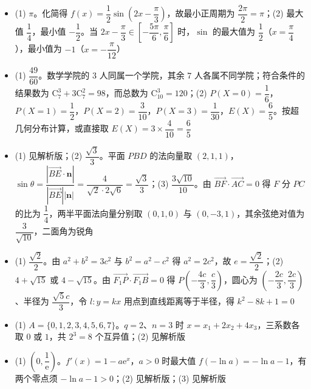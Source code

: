 \begin{itemize}[leftmargin=2.6em]
  \item[\textbf{15.}] (1) $\pi$。化简得 $f(x)=\dfrac12\sin\left(2x-\dfrac\pi3\right)$，故最小正周期为 $\dfrac{2\pi}{2}=\pi$；(2) 最大值 $\dfrac14$，最小值 $-\dfrac12$。当 $2x-\dfrac\pi3\in\left[-\dfrac{5\pi}{6},\dfrac\pi6\right]$ 时，$\sin$ 的最大值为 $\dfrac12$（$x=\dfrac\pi4$），最小值为 $-1$（$x=-\dfrac{\pi}{12}$）
  \item[\textbf{16.}] (1) $\dfrac{49}{60}$。数学学院的 $3$ 人同属一个学院，其余 $7$ 人各属不同学院；符合条件的结果数为 $\mathrm C_7^3+3\mathrm C_7^2=98$，而总数为 $\mathrm C_{10}^3=120$；(2) $P(X=0)=\dfrac16$，$P(X=1)=\dfrac12$，$P(X=2)=\dfrac3{10}$，$P(X=3)=\dfrac1{30}$，$E(X)=\dfrac65$。按超几何分布计算，或直接取 $E(X)=3\times\dfrac4{10}=\dfrac65$
  \item[\textbf{17.}] (1) 见解析版；(2) $\dfrac{\sqrt3}{3}$。平面 $PBD$ 的法向量取 $(2,1,1)$，$\sin\theta=\dfrac{|\overrightarrow{BE}\cdot\boldsymbol n|}{|\overrightarrow{BE}||\boldsymbol n|}=\dfrac{4}{\sqrt2\cdot2\sqrt6}=\dfrac{\sqrt3}{3}$；(3) $\dfrac{3\sqrt{10}}{10}$。由 $\overrightarrow{BF}\cdot\overrightarrow{AC}=0$ 得 $F$ 分 $PC$ 的比为 $\dfrac14$，两半平面法向量分别取 $(0,1,0)$ 与 $(0,-3,1)$，其余弦绝对值为 $\dfrac{3}{\sqrt{10}}$，二面角为锐角
  \item[\textbf{18.}] (1) $\dfrac{\sqrt2}{2}$。由 $a^2+b^2=3c^2$ 与 $b^2=a^2-c^2$ 得 $a^2=2c^2$，故 $e=\dfrac{\sqrt2}{2}$；(2) $4+\sqrt{15}$ 或 $4-\sqrt{15}$。由 $\overrightarrow{F_1P}\cdot\overrightarrow{F_1B}=0$ 得 $P\left(-\dfrac{4c}{3},\dfrac c3\right)$，圆心为 $\left(-\dfrac{2c}{3},\dfrac{2c}{3}\right)$、半径为 $\dfrac{\sqrt5c}{3}$，令 $l:y=kx$ 用点到直线距离等于半径，得 $k^2-8k+1=0$
  \item[\textbf{19.}] (1) $A=\{0,1,2,3,4,5,6,7\}$。$q=2$、$n=3$ 时 $x=x_1+2x_2+4x_3$，三系数各取 $0$ 或 $1$，共 $2^3=8$ 个互异值；(2) 见解析版
  \item[\textbf{20.}] (1) $\left(0,\dfrac1{\mathrm e}\right)$。$f'(x)=1-a\mathrm e^x$，$a>0$ 时最大值 $f(-\ln a)=-\ln a-1$，有两个零点须 $-\ln a-1>0$；(2) 见解析版；(3) 见解析版
\end{itemize}
